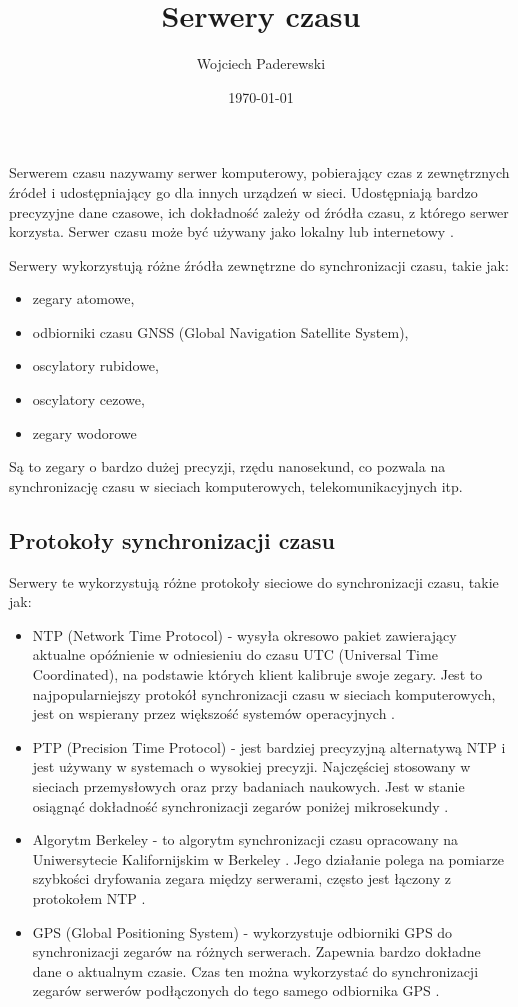 \documentclass[../main.tex]{subfiles}
\author{Wojciech Paderewski}
\date{\today}
\title{Serwery czasu}
\begin{document}
Serwerem czasu nazywamy serwer komputerowy, pobierający czas z zewnętrznych źródeł i udostępniający go dla innych urządzeń w sieci.
Udostępniają bardzo precyzyjne dane czasowe, ich dokładność zależy od źródła czasu, z którego serwer korzysta. Serwer czasu może być używany jako lokalny lub internetowy \cite{st:serwerczasu-jpg}.

Serwery wykorzystują różne źródła zewnętrzne do synchronizacji czasu, takie jak:
\begin{itemize}
  \item zegary atomowe,
  \item odbiorniki czasu GNSS (Global Navigation Satellite System),
  \item oscylatory rubidowe,
  \item oscylatory cezowe,
  \item zegary wodorowe
\end{itemize}

Są to zegary o bardzo dużej precyzji, rzędu nanosekund, co pozwala na synchronizację czasu w sieciach komputerowych, telekomunikacyjnych itp.

\subsection{Protokoły synchronizacji czasu}
Serwery te wykorzystują różne protokoły sieciowe do synchronizacji czasu, takie jak:
\begin{itemize}
  \item NTP (Network Time Protocol) - 
  wysyła okresowo pakiet zawierający aktualne opóźnienie w odniesieniu do czasu UTC (Universal Time Coordinated), na podstawie których klient kalibruje swoje zegary.
  Jest to najpopularniejszy protokół synchronizacji czasu w sieciach komputerowych, jest on wspierany przez większość systemów operacyjnych \cite{st:ntp}.
  \item PTP (Precision Time Protocol) - 
  jest bardziej precyzyjną alternatywą NTP i jest używany w systemach o wysokiej precyzji. Najczęściej stosowany w sieciach przemysłowych oraz przy badaniach naukowych. 
  Jest w stanie osiągnąć dokładność synchronizacji zegarów poniżej mikrosekundy \cite{st:ptp}.
  \item Algorytm Berkeley - to algorytm synchronizacji czasu opracowany na Uniwersytecie Kalifornijskim w Berkeley . 
  Jego działanie polega na pomiarze szybkości dryfowania zegara między serwerami, często jest łączony z protokołem NTP \cite{st:ntp}.
  \item GPS (Global Positioning System) -  wykorzystuje odbiorniki GPS do synchronizacji zegarów na różnych serwerach.
   Zapewnia bardzo dokładne dane o aktualnym czasie. Czas ten można wykorzystać do synchronizacji
  zegarów serwerów podłączonych do tego samego odbiornika GPS \cite{st:gps}.  
\end{itemize}
\end{document}
